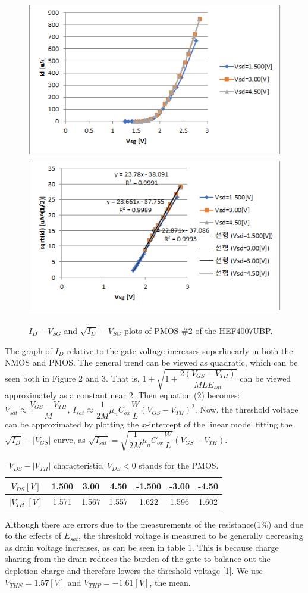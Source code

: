 \documentclass[a4paper, itemph]{oblivoir}
\theoremstyle{definition}
\begin{document}
\begin{figure}[htb]
    \centering
    \includegraphics{Vsg-Id_pmos.png}
    \includegraphics[width=0.43\linewidth]{Vsg-sqrt(Id)_pmos.png}
    \caption{$I_D-V_{SG}$ and $\sqrt{I_D}-V_{SG}$ plots of PMOS \#2 of the HEF4007UBP.}
\end{figure}
The graph of $I_D$ relative to the gate voltage increases superlinearly in both the NMOS and PMOS. The general trend can be viewed as quadratic, which can be seen both in Figure 2 and 3. That is, $1+\sqrt{1+\dfrac{2(V_{GS}-V_{TH})}{MLE_{sat}}}$ can be viewed approximately as a constant near 2. Then equation (2) becomes: $V_{sat}\approx\dfrac{V_{GS}-V_{TH}}{M}$, $I_{sat}\approx\dfrac{1}{2M}\mu_nC_{ox}\dfrac{W}{L}(V_{GS}-V_{TH})^2$. Now, the threshold voltage can be approximated by plotting the $x$-intercept of the linear model fitting the $
\sqrt{I_D}-|V_{GS}|$ curve, as $\sqrt{I_{sat}}=\sqrt{\dfrac{1}{2M}\mu_nC_{ox}\dfrac{W}{L}}(V_{GS}-V_{TH})$.
\begin{table}[htb]
    \centering
    \begin{tabular}{c|c|c|c|c|c|c}
        $V_{DS}[V]$ & 1.500 & 3.00 & 4.50 & -1.500 & -3.00 & -4.50\\
        \hline
        $|V_{TH}|[V]$ & 1.571 & 1.567 & 1.557 & 1.622 & 1.596 & 1.602
    \end{tabular}
    \caption{$V_{DS}-|V_{TH}|$ characteristic. $V_{DS} <0$ stands for the PMOS.}
\end{table}
Although there are errors due to the measurements of the resistance(1\%) and due to the effects of $E_{sat}$, the threshold voltage is measured to be generally decreasing as drain voltage increases, as can be seen in table 1. This is because charge sharing from the drain reduces the burden of the gate to balance out the depletion charge and therefore lowers the threshold voltage [1]. We use $V_{THN}=1.57[V]$ and $V_{THP}=-1.61[V]$, the mean.
\end{document}
